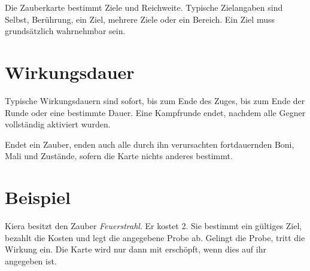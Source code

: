 Die Zauberkarte bestimmt Ziele und Reichweite. Typische Zielangaben sind Selbst, Berührung, ein Ziel, mehrere Ziele oder ein Bereich. Ein Ziel muss grundsätzlich wahrnehmbar sein.

\section{Wirkungsdauer}

Typische Wirkungsdauern sind sofort, bis zum Ende des Zuges, bis zum Ende der Runde oder eine bestimmte Dauer. Eine Kampfrunde endet, nachdem alle Gegner vollständig aktiviert wurden.

Endet ein Zauber, enden auch alle durch ihn verursachten fortdauernden Boni, Mali und Zustände, sofern die Karte nichts anderes bestimmt.

\section{Beispiel}

Kiera besitzt den Zauber \emph{Feuerstrahl}. Er kostet 2\manaLoss. Sie bestimmt ein gültiges Ziel, bezahlt die Kosten und legt die angegebene Probe ab. Gelingt die Probe, tritt die Wirkung ein. Die Karte wird nur dann mit \exhaust{} erschöpft, wenn dies auf ihr angegeben ist.